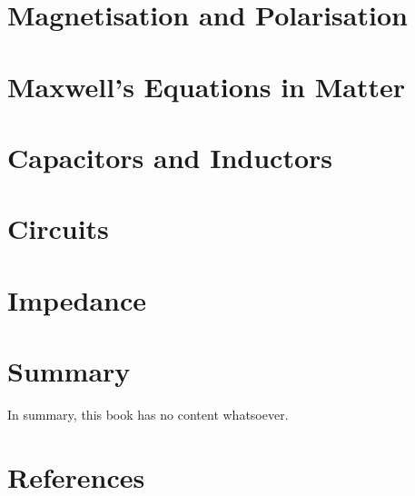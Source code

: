 \documentclass[
  letterpaper,
  DIV=11,
  numbers=noendperiod]{scrreprt}
\newlength{\cslhangindent}
\newenvironment{CSLReferences}[2] %
 {\begin{list}{}{%
  \setlength{\itemindent}{0pt}
  \setlength{\leftmargin}{0pt}
  \setlength{\parsep}{0pt}
  \ifodd #1
   \setlength{\leftmargin}{\cslhangindent}
   \setlength{\itemindent}{-1\cslhangindent}
  \fi
  \setlength{\itemsep}{#2\baselineskip}}}
 {\end{list}}
\begin{document}

\chapter{Magnetisation and
Polarisation}\label{magnetisation-and-polarisation}


\chapter{Maxwell's Equations in
Matter}\label{maxwells-equations-in-matter}


\chapter{Capacitors and Inductors}\label{capacitors-and-inductors}


\chapter{Circuits}\label{circuits}


\chapter{Impedance}\label{impedance}


\chapter{Summary}\label{summary}

In summary, this book has no content whatsoever.


\chapter*{References}\label{references}


\label{refs}
\begin{CSLReferences}{0}{1}
\end{CSLReferences}
\end{document}

